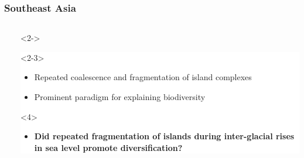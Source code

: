 {
\begin{frame}
    \frametitle{Southeast Asia}    
    \begin{columns}
        \ \\


        \vspace{-2.4cm}

        \begin{uncoverenv}<2->
        \colorbox{white}{
            \begin{minipage}[t][3.6cm][t]{1.1\textwidth}
                \begin{onlyenv}<2-3>
                \begin{itemize}
                    \item<2-> Repeated coalescence and fragmentation of island complexes
                    \item<3-> Prominent paradigm for explaining biodiversity
                \end{itemize}
                \end{onlyenv}

                \begin{onlyenv}<4>
                \begin{itemize}
                    \item<4> \textbf{Did repeated fragmentation of islands
                        during inter-glacial rises in sea level promote
                        diversification?}
                \end{itemize}
                \end{onlyenv}


\end{minipage}}
\end{uncoverenv}
\end{columns}
\end{frame}}
